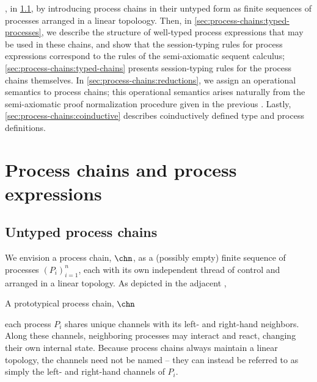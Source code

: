 , in \cref{sec:process-chains:untyped-chains}, by introducing process chains in their untyped form as finite sequences of processes arranged in a linear topoloogy.
Then, in \cref{sec:process-chains:typed-processes}, we describe the structure of well-typed process expressions that may be used in these chains, and show that the session-typing rules for process expressions correspond to the rules of the semi-axiomatic sequent calculus;
\cref{sec:process-chains:typed-chains} presents session-typing rules for the process chains themselves.
In \cref{sec:process-chains:reductions}, we assign an operational semantics to process chains; this operational semantics arises naturally from the semi-axiomatic proof normalization procedure given in the previous .
Lastly, \cref{sec:process-chains:coinductive} describes coinductively defined type and process definitions.


\section{Process chains and process expressions}\label{sec:process-chains:interpretation}

\subsection{Untyped process chains}\label{sec:process-chains:untyped-chains}

We envision a process chain, $\chn$, as a (possibly empty) finite sequence of processes $(P_i)_{i=1}^{n}$, each with its own independent thread of control and arranged in a linear topology.
As depicted in the adjacent ,%
%
\begin{marginfigure}
  \centering
  \caption{A prototypical process chain, $\chn$}\label{fig:singleton-processes:chain-topology}
\end{marginfigure}
%
each process $P_i$ shares unique channels with its left- and right-hand neighbors.
Along these channels, neighboring processes may interact and react, changing their own internal state.
Because process chains always maintain a linear topology, the channels need not be named -- they can instead be referred to as simply the left- and right-hand channels of $P_i$.

